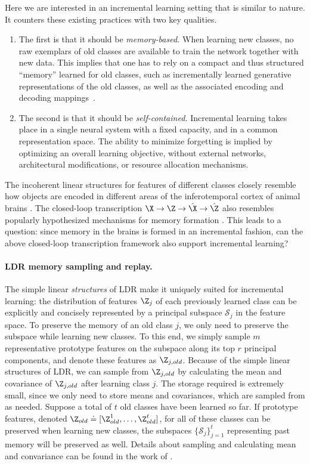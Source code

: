 \documentclass[../../book-main.tex]{subfiles}
\begin{document}
Here we are interested in an incremental learning setting that is similar to nature. It  counters these existing practices with two key qualities. 
\begin{enumerate}
    \item The first is that it should be \emph{memory-based.} When learning new classes, no raw exemplars of old classes are available to train the network together with new data. This implies that one has to rely on a compact and thus structured ``memory'' learned for old classes, such as incrementally learned generative representations of the old classes, as well as the associated encoding and decoding mappings~\cite{fearnet}. 
    \item The second is that it should be \emph{self-contained.} Incremental learning takes place in a single neural system with a fixed capacity, and in a common representation space. The ability to minimize forgetting is implied by optimizing an overall learning objective, without external networks, architectural modifications, or resource allocation mechanisms.
\end{enumerate}

The incoherent linear structures for features of different classes closely resemble how objects are encoded in different areas of the inferotemporal cortex of animal brains \cite{Chang-Cell-2017,Bao2020AMO}. The closed-loop transcription $\X \rightarrow \Z \rightarrow \hat{\X} \rightarrow \hat{\Z}$ also resembles popularly hypothesized mechanisms for memory formation \cite{2020Vandeven,Josselyn2020MemoryER}. This leads to a question: since memory in the brains is formed in an incremental fashion, can the above closed-loop transcription framework also support incremental learning?

\paragraph{LDR memory sampling and replay.} The simple linear {\em structures} of LDR make it uniquely suited for incremental learning: the distribution of features $\Z_j$ of each previously learned class can be explicitly and concisely represented by a principal subspace $\mathcal{S}_j$ in the feature space. To preserve the memory of an old class $j$, we only need to preserve the subspace while learning new classes. To this end, we simply sample $m$ representative prototype features on the subspace along its top $r$ principal components, and denote these features as $\Z_{j,old}$. Because of the simple linear structures of LDR, we can sample from $\Z_{j,old}$ by calculating the mean and covariance of $\Z_{j,old}$ after learning class $j$. The storage required is extremely small, since we only need to store means and covariances, which are sampled from as needed. Suppose a total of $t$ old classes have been learned so far. If prototype features, denoted $\Z_{old} \doteq [\Z^1_{old},\ldots, \Z^t_{old}]$, for all of these classes can be preserved when learning new classes, the subspaces $\{\mathcal{S}_j\}_{j=1}^t$ representing past memory will be preserved as well. Details about sampling and calculating mean and convariance can be found in the work of \cite{tong2023incremental}.
\end{document}
